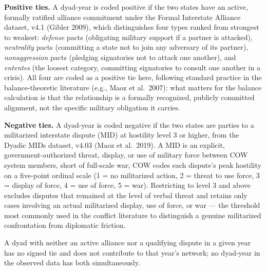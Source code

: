 \documentclass[Afour,sageh,times,doublespace]{sagej}
\begin{document}
\textbf{Positive ties.} A dyad-year is coded positive if the two states have an active, formally ratified alliance commitment under the Formal Interstate Alliance dataset, v4.1 (Gibler 2009), which distinguishes four types ranked from strongest to weakest: \emph{defense} pacts (obligating military support if a partner is attacked), \emph{neutrality} pacts (committing a state not to join any adversary of its partner), \emph{nonaggression} pacts (pledging signatories not to attack one another), and \emph{ententes} (the loosest category, committing signatories to consult one another in a crisis). All four are coded as a positive tie here, following standard practice in the balance-theoretic literature (e.g., Maoz et al.~2007): what matters for the balance calculation is that the relationship is a formally recognized, publicly committed alignment, not the specific military obligation it carries.

\textbf{Negative ties.} A dyad-year is coded negative if the two states are parties to a militarized interstate dispute (MID) at hostility level 3 or higher, from the Dyadic MIDs dataset, v4.03 (Maoz et al.~2019). A MID is an explicit, government-authorized threat, display, or use of military force between COW system members, short of full-scale war; COW codes each dispute's peak hostility on a five-point ordinal scale (1 = no militarized action, 2 = threat to use force, 3 = display of force, 4 = use of force, 5 = war). Restricting to level 3 and above excludes disputes that remained at the level of verbal threat and retains only cases involving an actual militarized display, use of force, or war --- the threshold most commonly used in the conflict literature to distinguish a genuine militarized confrontation from diplomatic friction.

A dyad with neither an active alliance nor a qualifying dispute in a given year has no signed tie and does not contribute to that year's network; no dyad-year in the observed data has both simultaneously.
\end{document}
